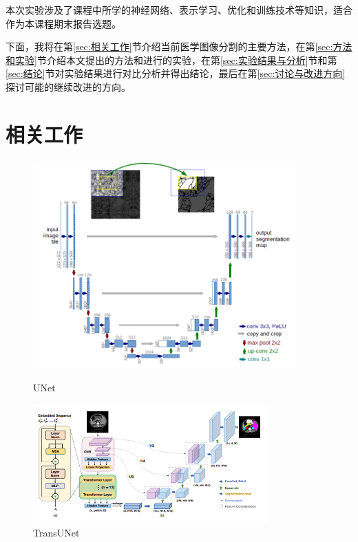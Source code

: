 \documentclass[hyperref,a4paper,UTF8]{ctexart}
\begin{document}
本次实验涉及了课程中所学的神经网络、表示学习、优化和训练技术等知识，适合作为本课程期末报告选题。

下面，我将在第\ref{sec:相关工作}节介绍当前医学图像分割的主要方法，在第\ref{sec:方法和实验}节介绍本文提出的方法和进行的实验，在第\ref{sec:实验结果与分析}节和第\ref{sec:结论}节对实验结果进行对比分析并得出结论，最后在第\ref{sec:讨论与改进方向}探讨可能的继续改进的方向。

\section{相关工作\label{sec:相关工作}}

\begin{figure}[h]
    \centering
    \begin{minipage}[t]{0.38\textwidth}
        \centering
        \includegraphics[width=0.9\textwidth]{figures/UNet.png}
        \caption{UNet}
        \label{fig:UNet}
    \end{minipage}
    \begin{minipage}[t]{0.58\textwidth}
        \centering
        \includegraphics[width=0.8\textwidth]{figures/TransUNet.png}
        \caption{TransUNet}
        \label{fig:TransUNet}
    \end{minipage}
\end{figure}
\end{document}
